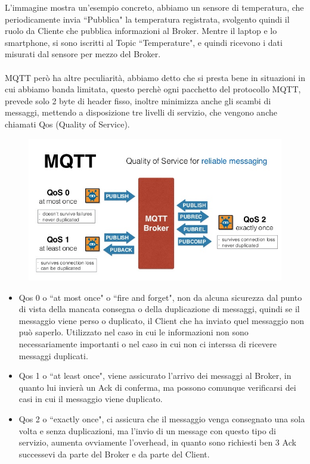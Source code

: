 \documentclass{article}
\begin{document}
L'immagine mostra un'esempio concreto, abbiamo un sensore di temperatura, che periodicamente invia ``Pubblica" la temperatura registrata, svolgento quindi il ruolo da Cliente che pubblica informazioni al Broker. Mentre il laptop e lo smartphone, si sono iscritti al Topic ``Temperature", e quindi ricevono i dati misurati dal sensore per mezzo del Broker.\\\\
MQTT però ha altre peculiarità, abbiamo detto che si presta bene in situazioni in cui abbiamo banda limitata, questo perchè ogni pacchetto del protocollo MQTT, prevede solo 2 byte di header fisso, inoltre minimizza anche gli scambi di messaggi, mettendo a disposizione tre livelli di servizio, che vengono anche chiamati Qos (Quality of Service).

\begin{figure}[htbp]
	\centerline{
		\includegraphics[scale=0.4]{immagini/mqtt_qos.jpg}
	}
\end{figure}

\begin{itemize}
	\item Qos 0 o ``at most once" o ``fire and forget", non da alcuna sicurezza dal punto di vista della mancata consegna o della duplicazione di messaggi, quindi se il messaggio viene perso o duplicato, il Client che ha inviato quel messaggio non può saperlo. Utilizzato nel caso in cui le informazioni non sono necessariamente importanti o nel caso in cui non ci interssa di ricevere messaggi duplicati.
	\item Qos 1 o ``at least once", viene assicurato l'arrivo dei messaggi al Broker, in quanto lui invierà un Ack di conferma, ma possono comunque verificarsi dei casi in cui il messaggio viene duplicato.
	\item Qos 2 o ``exactly once", ci assicura che il messaggio venga consegnato una sola volta e senza duplicazioni, ma l'invio di un message con questo tipo di servizio, aumenta ovviamente l'overhead, in quanto sono richiesti ben 3 Ack successevi da parte del Broker e da parte del Client.
\end{itemize}
\end{document}
